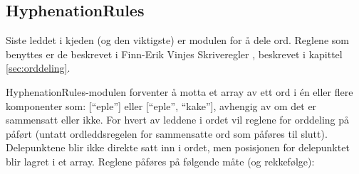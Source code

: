 \subsection{HyphenationRules}

Siste leddet i kjeden (og den viktigste) er modulen for å dele ord. Reglene som benyttes er de beskrevet i Finn-Erik Vinjes Skriveregler \cite{vinje}, beskrevet i kapittel \ref{sec:orddeling}. 

HyphenationRules-modulen forventer å motta et array av ett ord i én eller flere komponenter som: [“eple”] eller [“eple”, “kake”], avhengig av om det er sammensatt eller ikke. For hvert av  leddene i ordet vil reglene for orddeling på påført (untatt ordleddsregelen for sammensatte ord som påføres til slutt). Delepunktene blir ikke direkte satt inn i ordet, men posisjonen for delepunktet blir lagret i et array. Reglene påføres på følgende måte (og rekkefølge): 
